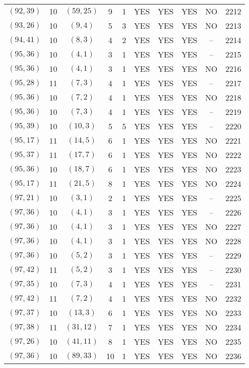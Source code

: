 \begin{longtable}{|c|c|c|c|c|c|c|c|c|c|}
$(92, 39)$ & 10 & $(59, 25)$ & 9 & 1 & YES & YES & YES & NO & 2212\\
$(93, 26)$ & 10 & $(9, 4)$ & 5 & 3 & YES & YES & YES & NO & 2213\\
$(94, 41)$ & 10 & $(8, 3)$ & 4 & 2 & YES & YES & YES & -- & 2214\\
$(95, 36)$ & 10 & $(4, 1)$ & 3 & 1 & YES & YES & YES & -- & 2215\\
$(95, 36)$ & 10 & $(4, 1)$ & 3 & 1 & YES & YES & YES & NO & 2216\\
$(95, 28)$ & 11 & $(7, 3)$ & 4 & 1 & YES & YES & YES & -- & 2217\\
$(95, 36)$ & 10 & $(7, 2)$ & 4 & 1 & YES & YES & YES & NO & 2218\\
$(95, 36)$ & 10 & $(7, 3)$ & 4 & 1 & YES & YES & YES & -- & 2219\\
$(95, 39)$ & 10 & $(10, 3)$ & 5 & 5 & YES & YES & YES & -- & 2220\\
$(95, 17)$ & 11 & $(14, 5)$ & 6 & 1 & YES & YES & YES & NO & 2221\\
$(95, 37)$ & 11 & $(17, 7)$ & 6 & 1 & YES & YES & YES & NO & 2222\\
$(95, 36)$ & 10 & $(18, 7)$ & 6 & 1 & YES & YES & YES & NO & 2223\\
$(95, 17)$ & 11 & $(21, 5)$ & 8 & 1 & YES & YES & YES & NO & 2224\\
$(97, 21)$ & 10 & $(3, 1)$ & 2 & 1 & YES & YES & YES & -- & 2225\\
$(97, 36)$ & 10 & $(4, 1)$ & 3 & 1 & YES & YES & YES & -- & 2226\\
$(97, 36)$ & 10 & $(4, 1)$ & 3 & 1 & YES & YES & YES & NO & 2227\\
$(97, 36)$ & 10 & $(4, 1)$ & 3 & 1 & YES & YES & YES & NO & 2228\\
$(97, 36)$ & 10 & $(5, 2)$ & 3 & 1 & YES & YES & YES & -- & 2229\\
$(97, 42)$ & 11 & $(5, 2)$ & 3 & 1 & YES & YES & YES & -- & 2230\\
$(97, 35)$ & 10 & $(7, 3)$ & 4 & 1 & YES & YES & YES & -- & 2231\\
$(97, 42)$ & 11 & $(7, 2)$ & 4 & 1 & YES & YES & YES & NO & 2232\\
$(97, 37)$ & 10 & $(13, 3)$ & 6 & 1 & YES & YES & YES & NO & 2233\\
$(97, 38)$ & 11 & $(31, 12)$ & 7 & 1 & YES & YES & YES & NO & 2234\\
$(97, 26)$ & 10 & $(41, 11)$ & 8 & 1 & YES & YES & YES & NO & 2235\\
$(97, 36)$ & 10 & $(89, 33)$ & 10 & 1 & YES & YES & YES & NO & 2236\\

\end{longtable}
